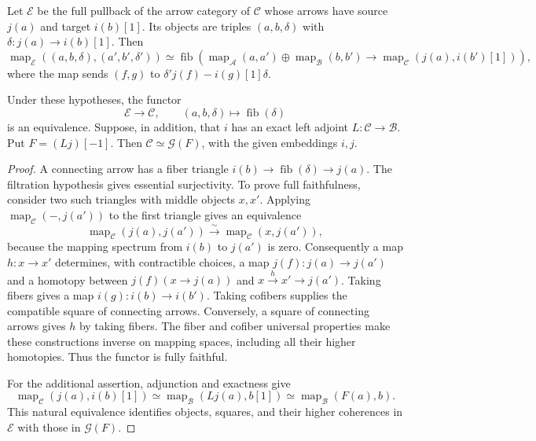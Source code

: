 Let $\mathcal E$ be the full pullback of the arrow category of
$\mathcal C$ whose arrows have source $j(a)$ and target $i(b)[1]$.
Its objects are triples $(a,b,\delta)$ with
$\delta:j(a)\to i(b)[1]$. Then
\[
 \operatorname{map}_{\mathcal E}((a,b,\delta),(a',b',\delta'))
 \simeq\operatorname{fib}\left(
 \operatorname{map}_{\mathcal A}(a,a')\oplus
 \operatorname{map}_{\mathcal B}(b,b')
 \longrightarrow\operatorname{map}_{\mathcal C}(j(a),i(b')[1])
 \right),
\]
where the map sends $(f,g)$ to $\delta'j(f)-i(g)[1]\delta$.

\begin{proposition}
\label{v4-arith:eis:semiorthogonal-reconstruction}
Under these hypotheses, the functor
\[
 \mathcal E\longrightarrow\mathcal C,\qquad
 (a,b,\delta)\longmapsto\operatorname{fib}(\delta)
\]
is an equivalence. Suppose, in addition, that $i$ has an exact left
adjoint $L:\mathcal C\to\mathcal B$. Put $F=(Lj)[-1]$.
Then $\mathcal C\simeq\mathcal G(F)$, with the given embeddings $i,j$.
\end{proposition}

\begin{proof}
A connecting arrow has a fiber triangle
$i(b)\to\operatorname{fib}(\delta)\to j(a)$.
The filtration hypothesis gives essential surjectivity.
To prove full faithfulness, consider two such triangles with middle
objects $x,x'$. Applying $\operatorname{map}_{\mathcal C}(-,j(a'))$
to the first triangle gives an equivalence
\[
 \operatorname{map}_{\mathcal C}(j(a),j(a'))
       \xrightarrow{\sim}
 \operatorname{map}_{\mathcal C}(x,j(a')),
\]
because the mapping spectrum from $i(b)$ to $j(a')$ is zero.
Consequently a map $h:x\to x'$ determines, with contractible choices,
a map $j(f):j(a)\to j(a')$ and a homotopy between
$j(f)(x\to j(a))$ and $x\xrightarrow{h}x'\to j(a')$.
Taking fibers gives a map $i(g):i(b)\to i(b')$.
Taking cofibers supplies the compatible square of connecting arrows.
Conversely, a square of connecting arrows gives $h$ by taking fibers.
The fiber and cofiber universal properties make these constructions
inverse on mapping spaces, including all their higher homotopies.
Thus the functor is fully faithful.

For the additional assertion, adjunction and exactness give
\[
 \operatorname{map}_{\mathcal C}(j(a),i(b)[1])
 \simeq\operatorname{map}_{\mathcal B}(Lj(a),b[1])
 \simeq\operatorname{map}_{\mathcal B}(F(a),b).
\]
This natural equivalence identifies objects, squares, and their higher
coherences in $\mathcal E$ with those in $\mathcal G(F)$.
\end{proof}

